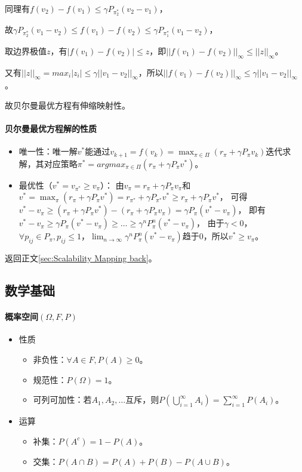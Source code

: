 \documentclass[
12pt, %
a4paper, 
oneside, %
headinclude,footinclude, %
]{scrartcl}
\begin{document}
同理有$ f(v_2) - f(v_1) \leq \gamma P_{\pi_2^*} (v_2 - v_1) $，

故$ \gamma P_{\pi_2^*} (v_1 - v_2)\leq f(v_1) - f(v_2) \leq \gamma P_{\pi_1^*} (v_1 - v_2) $，

取边界极值$ z $，有$ |f(v_1) - f(v_2)| \leq z $，即$ ||f(v_1) - f(v_2)||_\infty \leq ||z||_\infty $。

又有$ ||z||_\infty = max_i |z_i| \leq \gamma ||v_1 - v_2||_\infty $，所以$ ||f(v_1) - f(v_2)||_\infty \leq \gamma ||v_1 - v_2||_\infty $。

故贝尔曼最优方程有伸缩映射性。
\paragraph{贝尔曼最优方程解的性质}
\begin{itemize}
\item 唯一性：唯一解$ v^* $能通过$ v_{k + 1} = f(v_k) = \max_{\pi \in \Pi} (r_\pi + \gamma P_\pi v_k) $迭代求解，其对应策略$ \pi^* = argmax_{\pi \in \Pi} (r_\pi + \gamma P_\pi v^*) $。
\item 最优性（$ v^* = v_{\pi^*} \geq v_{\pi} $）：
由$ v_{\pi} = r_{\pi} + \gamma P_{\pi} v_{\pi} $和$ v^* = \max_{\pi} (r_{\pi} + \gamma P_{\pi} v^*) = r_{\pi^*} + \gamma P_{\pi^*} v^* \geq r_{\pi} + \gamma P_{\pi} v^* $，
可得$ v^* - v_{\pi} \geq (r_{\pi} + \gamma P_{\pi} v^*) - (r_{\pi} + \gamma P_{\pi} v_{\pi}) = \gamma P_{\pi} (v^* - v_{\pi}) $，
即有$ v^* - v_{\pi} \geq \gamma P_{\pi} (v^* - v_{\pi}) \geq \dots \geq \gamma^n P_{\pi}^n (v^* - v_{\pi}) $，
由于$ \gamma < 0 $，$ \forall p_{ij} \in P_{\pi}, p_{ij} \leq 1 $，$ \lim_{n \to \infty} \gamma^n P_{\pi}^n (v^* - v_{\pi}) $趋于0，所以$ v^* \geq v_{\pi} $。
\end{itemize}

返回正文\ref{sec:Scalability Mapping back}。
\subsection{数学基础}
\paragraph*{概率空间$ (\Omega, F, P) $}
\begin{itemize}
\item 性质
\begin{itemize}
\item 非负性：$ \forall A \in F,P(A) \geq 0 $。
\item 规范性：$ P(\Omega) = 1 $。
\item 可列可加性：若$ A_1, A_2, \dots $互斥，则$ P(\bigcup_{i = 1}^{\infty} A_i) = \sum_{i = 1}^{\infty} P(A_i) $。
\end{itemize}
\item 运算
\begin{itemize}
\item 补集：$ P(A^c) = 1 - P(A) $。
\item 交集：$ P(A \cap B) = P(A) + P(B) - P(A \cup B) $。
\end{itemize}
\end{itemize}
\end{document}
